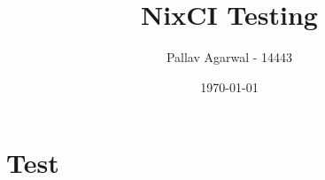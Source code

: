 \documentclass[a4paper, 10pt]{extarticle}
\title{NixCI Testing}
\author{Pallav Agarwal - 14443}
\date{\today}
\begin{document}
\maketitle
\section{Test}
\end{document}
